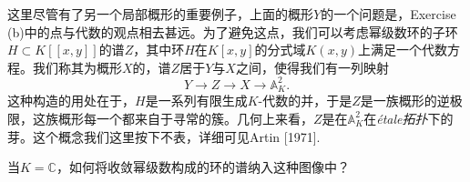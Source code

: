这里尽管有了另一个局部概形的重要例子，上面的概形$Y$的一个问题是，Exercise {\thethm}(b)中的点与代数的观点相去甚远。为了避免这点，我们可以考虑幂级数环的子环$H\subset K[\![x,y]\!]$的谱$Z$，其中环$H$在$K[x,y]$的分式域$K(x,y)$上满足一个代数方程。我们称其为概形$X$的，谱$Z$居于$Y$与$X$之间，使得我们有一列映射
\[
	Y\to Z\to X\to \mathbb{A}_K^2.
\]
这种构造的用处在于，$H$是一系列有限生成$K$-代数的并，于是$Z$是一族概形的逆极限，这族概形每一个都来自于寻常的簇。几何上来看，$Z$是在$\mathbb{A}_K^2$在\textit{\'{e}tale拓扑}下的芽。这个概念我们这里按下不表，详细可见Artin [1971].

\begin{exe}
	当$K=\mathbb{C}$，如何将收敛幂级数构成的环的谱纳入这种图像中？
\end{exe}